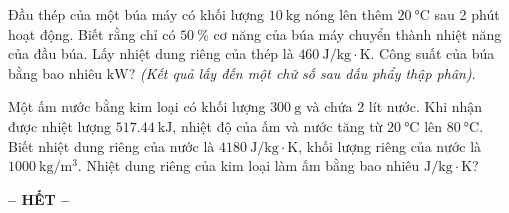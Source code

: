 \begin{ex}
	Đầu thép của một búa máy có khối lượng $\SI{10}{\kilogram}$ nóng lên thêm $\SI{20}{\celsius}$ sau 2 phút hoạt động. Biết rằng chỉ có $\SI{50}{\percent}$ cơ năng của búa máy chuyển thành nhiệt năng của đầu búa. Lấy nhiệt dung riêng của thép là $\SI{460}{\joule/\kilogram\cdot\kelvin}$. Công suất của búa bằng bao nhiêu $\si{\kilo\watt}$? \textit{(Kết quả lấy đến một chữ số sau dấu phẩy thập phân)}.
\end{ex}
\begin{ex}
	Một ấm nước bằng kim loại có khối lượng $\SI{300}{\gram}$ và chứa 2 lít nước. Khi nhận được nhiệt lượng $\SI{517.44}{\kilo\joule}$, nhiệt độ của ấm và nước tăng từ $\SI{20}{\celsius}$ lên $\SI{80}{\celsius}$. Biết nhiệt dung riêng của nước là $\SI{4180}{\joule/\kilogram\cdot\kelvin}$, khối lượng riêng của nước là $\SI{1000}{\kilogram/\meter^3}$. Nhiệt dung riêng của kim loại làm ấm bằng bao nhiêu $\si{\joule/\kilogram\cdot\kelvin}$?
\end{ex}

\begin{center}
	\textbf{-- HẾT --}
\end{center}